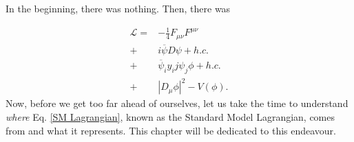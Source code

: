 \documentclass[10pt,a4paper]{book}
\begin{document}
In the beginning, there was nothing. Then, there was 

\begin{equation}
\begin{split}
\mathcal{L} =& -\frac{1}{4}F_{\mu\nu}F^{\mu\nu}\\ +& i\overline{\psi}D\psi + h.c.\\ +& \overline{\psi}_i y_ij \psi_j \phi + h.c.\\ +& |D_\mu \phi|^2 - V(\phi).
\end{split}
\label{SM Lagrangian}
\end{equation}
Now, before we get too far ahead of ourselves, let us take the time to understand \emph{where} Eq. \ref{SM Lagrangian}, known as the Standard Model Lagrangian, comes from and what it represents. This chapter will be dedicated to this endeavour.
\end{document}
